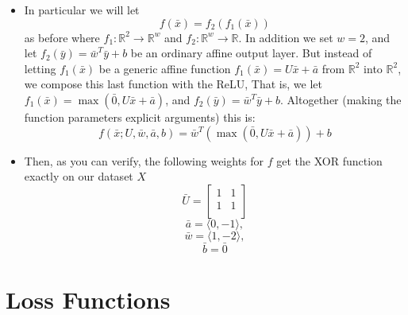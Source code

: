 \documentclass{article}
\begin{document}
\begin{itemize}
\item In particular we will let  
$$f(\bar{x}) = f_{2}(f_{1}(\bar{x}))$$ as before where $f_{1}:\mathbb{R}^{2} \rightarrow \mathbb{R}^{w}$ and $f_{2}:\mathbb{R}^{w} \rightarrow \mathbb{R}$.  In addition we set
$w = 2$, and let $f_{2}(\bar{y}) = \bar{w}^{T}\bar{y} + b$ be an ordinary affine output layer.  But instead of letting 
$f_{1}(\bar{x})$ be a generic affine function $f_{1}(\bar{x}) = U\bar{x} + \bar{a}$ from $\mathbb{R}^{2}$ into $\mathbb{R}^{2}$, we compose this last function with the ReLU, 
That is, we let $f_{1}(\bar{x}) = \max(\bar{0}, U\bar{x} + \bar{a})$, and  $f_{2}(\bar{y}) = \bar{w}^{T}\bar{y} + b$. 
Altogether (making the function parameters explicit arguments) this is:
$$ f(\bar{x}; U, \bar{w}, \bar{a}, b) = \bar{w}^{T}(\max(\bar{0}, U\bar{x} + \bar{a})) + b$$

\item Then, as you can verify, the following weights for $f$ get the XOR function exactly on our dataset $X$
$$\bar{U} = \left [\begin{array}{cc}
1 & 1 \\
1 & 1 \\
\end{array}\right]$$
$$\bar{a} = \langle 0, -1\rangle,$$
$$\bar{w} = \langle 1, -2 \rangle,$$
$$ \bar{b} = \bar{0}$$

\end{itemize}

\section{Loss Functions}
\end{document}

